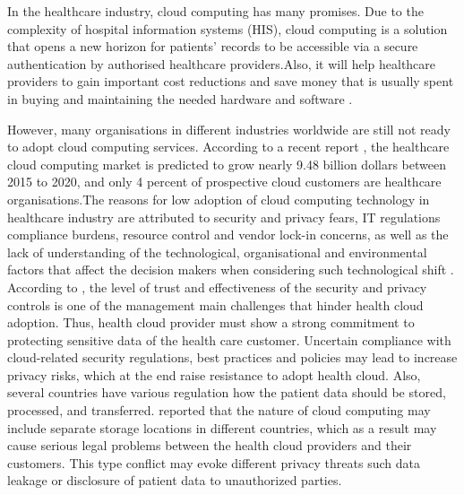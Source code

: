 In the healthcare industry, cloud computing has many promises. Due to the complexity of hospital information systems (HIS), cloud computing is a solution that opens a new horizon for patients’ records to be accessible via a secure authentication by authorised healthcare providers\cite{Grindle2013}.Also, it will help healthcare providers to gain important cost reductions and save money that is usually spent in buying and maintaining the needed hardware and software \cite{ahuja2012survey,Masrom2014}.

However, many organisations in different industries worldwide are still not ready to adopt cloud computing services. According to a recent report \cite{MarketsandMarkets}, the healthcare cloud computing market is predicted to grow nearly 9.48 billion dollars between 2015 to 2020, and only 4 percent of prospective cloud customers are healthcare organisations.The reasons for low adoption of cloud computing technology in healthcare industry are attributed to security and privacy fears, IT regulations compliance burdens, resource control and vendor lock-in concerns, as well as the lack of understanding of the technological, organisational and environmental factors that affect the decision makers when considering such technological shift \cite{MarketsandMarkets,tweel2012examining}.
\\
According to \citet{Mu2011}, the level of trust and effectiveness of the security and privacy controls is one of the management main challenges that hinder health cloud adoption. Thus, health cloud provider must show a strong commitment to protecting sensitive data of the health care customer. Uncertain compliance with cloud-related security regulations, best practices and policies may lead to increase privacy risks, which at the end raise resistance to adopt health cloud. Also, several countries have various regulation how the patient data should be stored, processed, and transferred.\cite{Mu2011} reported that the nature of cloud computing may include separate storage locations in different countries, which as a result may cause serious legal problems between the health cloud providers and their customers. This type conflict may evoke different privacy threats such data leakage or disclosure of patient data to unauthorized parties.




